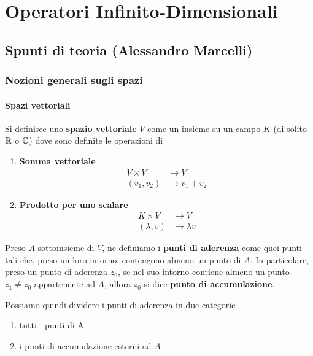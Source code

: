 \chapter{Operatori Infinito-Dimensionali}

\section{Spunti di teoria (Alessandro Marcelli)}

\subsection{Nozioni generali sugli spazi}

\subsubsection{Spazi vettoriali}

Si definisce uno \textbf{spazio vettoriale} $V$ come un insieme su un campo $K$ (di solito $\mathbb{R}$ o $\mathbb{C}$) dove sono definite le operazioni di
\begin{enumerate}
	\item \textbf{Somma vettoriale}
	\begin{align}
		V \times V &\rightarrow V\\
		(v_1,v_2)&\rightarrow v_1 + v_2
	\end{align}
	\item \textbf{Prodotto per uno scalare}
	\begin{align}
	K \times V &\rightarrow V\\
	(\lambda,v)&\rightarrow \lambda v
\end{align}
\end{enumerate}

Preso $A$ sottoinsieme di $V$, ne definiamo i \textbf{punti di aderenza} come quei punti tali che, preso un loro intorno, contengono almeno un punto di $A$. \newline
In particolare, preso un punto di aderenza $z_0$, se nel suo intorno contiene almeno un punto $z_1 \neq z_0$ appartenente ad $A$, allora $z_0$ si dice \textbf{punto di accumulazione}.

Possiamo quindi dividere i punti di aderenza in due categorie
\begin{enumerate}
	\item tutti i punti di A
	\item  i punti di accumulazione esterni ad $A$
\end{enumerate}

